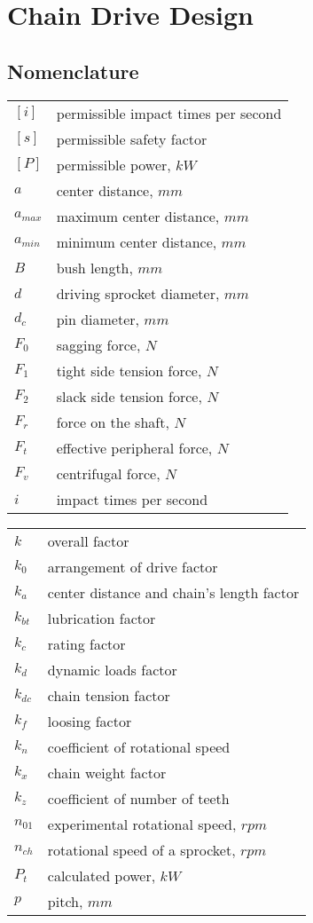 \chapter{Chain Drive Design}
\section{Nomenclature}
\begin{tabular}[t]{lp{7cm}}
		$ [i] $ & permissible impact times per second\\
		$ [s] $ & permissible safety factor\\
		$ [P] $ & permissible power, $ \unit{kW} $\\
		$ a $ & center distance, $ \unit{mm} $\\
		$ a_{max} $ & maximum center distance, $ \unit{mm} $\\
		$ a_{min} $ & minimum center distance, $ \unit{mm} $\\
		$ B $ & bush length, $ \unit{mm} $\\
		$ d $ & driving sprocket diameter, $ \unit{mm} $\\
		$ d_c $ & pin diameter, $ \unit{mm} $\\
		$ F_0 $ & sagging force, $ \unit{N} $\\
		$ F_1 $ & tight side tension force, $ \unit{N} $\\
		$ F_2 $ & slack side tension force, $ \unit{N} $\\
		$ F_r $ & force on the shaft, $ \unit{N} $\\
		$ F_t $ & effective peripheral force, $ \unit{N} $\\
		$ F_v $ & centrifugal force, $ \unit{N} $\\
		$ i $ & impact times per second\\
\end{tabular}
\begin{tabular}[t]{lp{7cm}}	
		$ k $ & overall factor\\
		$ k_0 $ & arrangement of drive factor\\
		$ k_a $ & center distance and chain's length factor\\
		$ k_{bt} $ & lubrication factor\\
		$ k_c $ & rating factor\\
		$ k_d $ & dynamic loads factor\\
		$ k_{dc} $ & chain tension  factor\\
		$ k_f $ & loosing factor\\
		$ k_n $ & coefficient of rotational speed\\
		$ k_x $ & chain weight factor\\
		$ k_z $ & coefficient of number of teeth\\
		$ n_{01} $ & experimental rotational speed, $ \unit{rpm} $\\
		$ n_{ch} $ & rotational speed of a sprocket, $ \unit{rpm} $\\
		$ P_t $ & calculated power, $ \unit{kW} $\\
		$ p $ & pitch, $ \unit{mm} $\\
\end{tabular}\newpage
